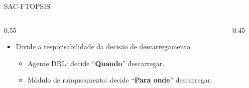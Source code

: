 \documentclass[aspectratio=169]{beamer}
\begin{document}
\begin{frame}{SAC-FTOPSIS}
    \begin{columns}[T]
        \begin{column}{0.55\textwidth}
            \vspace{1cm}
            \begin{itemize}
                \item Divide a responsabilidade da decisão de descarregamento.
                \begin{itemize}
                    \item Agente DRL: decide ``\textbf{Quando}'' descarregar.
                    \item Módulo de ranqueamento: decide ``\textbf{Para onde}'' descarregar.
                \end{itemize}
            \end{itemize}
        \end{column}
        \begin{column}{0.45\textwidth}
            \centering
            \vspace{0.5cm}
        \end{column}
    \end{columns}
\end{frame}
\end{document}
